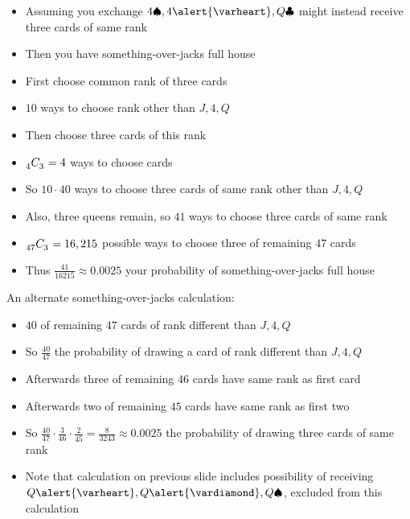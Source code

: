 \documentclass[handout]{beamer}
\theoremstyle{definition}
\newcommand\ncr[2]{\tensor[_{#1}]C{_{#2}}}
\newcommand{\hs}{\alert{\varheart}}
\newcommand{\ds}{\alert{\vardiamond}}
\newcommand{\s}{\spadesuit}
\newcommand{\cs}{\clubsuit}
\begin{document}
\begin{frame}
\begin{itemize}
\item Assuming you exchange $4\s,4\hs,Q\cs$
might instead receive three cards of same rank
\item Then you have \alert{something-over-jacks full house}
\item First choose common rank of three cards
\item $10$ ways to choose rank other than $J,4,Q$
\item Then choose three cards of this rank
\item $\ncr{4}{3}=4$ ways to choose cards
\item So $10\cdot 40$ ways to choose three cards of
same rank other than $J,4,Q$
\item Also, three queens remain, so $41$ ways
to choose three cards of same rank
\item $\ncr{47}{3}=16,215$ possible ways to
choose three of remaining $47$ cards
\item Thus $\frac{41}{16215}\approx 0.0025$
your probability of something-over-jacks full house
\end{itemize}
\end{frame}

\begin{frame}
An alternate something-over-jacks calculation:
\begin{itemize}
\item $40$ of remaining $47$ cards of rank different than $J,4,Q$
\item So $\frac{40}{47}$ the probability of drawing
a card of rank different than $J,4,Q$
\item Afterwards three of remaining $46$ cards have same rank as first card
\item Afterwards two of remaining $45$ cards have same rank
as first two
\item So $\frac{40}{47}\cdot\frac{3}{46}\cdot\frac{2}{45}
=\frac{8}{3243}\approx 0.0025$ the probability
of drawing three cards of same rank
\item Note that calculation on previous slide includes
possibility of receiving $Q\hs,Q\ds,Q\s$, excluded from this calculation
\end{itemize}
\end{frame}
\end{document}
